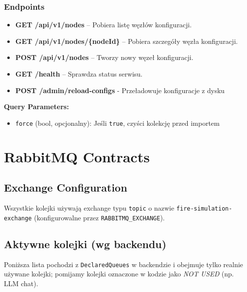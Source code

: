 \documentclass[11pt,a4paper] {article}
\begin{document}
\subsubsection{Endpoints}

\begin{itemize}
  \item \textbf{GET /api/v1/nodes} -- Pobiera listę węzłów konfiguracji.
  \item \textbf{GET /api/v1/nodes/\{nodeId\}} -- Pobiera szczegóły węzła konfiguracji.
  \item \textbf{POST /api/v1/nodes} -- Tworzy nowy węzeł konfiguracji.
  \item \textbf{GET /health} -- Sprawdza status serwisu.
  \item \textbf{POST /admin/reload-configs} - Przeładowuje konfiguracje z dysku
\end{itemize}

\textbf{Query Parameters:}
\begin{itemize}
    \item \texttt{force} (bool, opcjonalny): Jeśli \texttt{true}, czyści kolekcję przed importem
\end{itemize}

\section{RabbitMQ Contracts}

\subsection{Exchange Configuration}

Wszystkie kolejki używają exchange typu \texttt{topic} o nazwie \texttt{fire-simulation-exchange} (konfigurowalne przez \texttt{RABBITMQ\_EXCHANGE}).

\subsection{Aktywne kolejki (wg backendu)}

Poniższa lista pochodzi z \texttt{DeclaredQueues} w backendzie i obejmuje tylko realnie używane kolejki; pomijamy kolejki oznaczone w kodzie jako \textit{NOT USED} (np. LLM chat).
\end{document}

